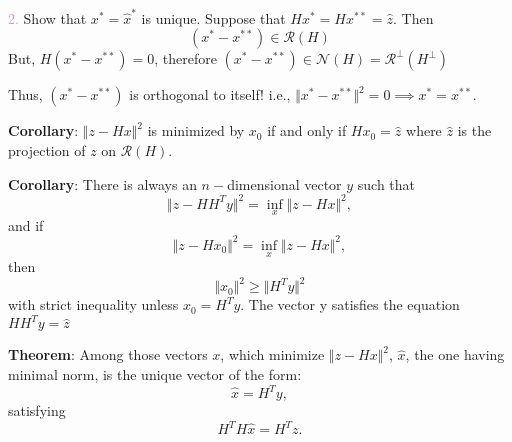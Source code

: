 \documentclass[aspectratio=169]{beamer}
\begin{document}
\begin{frame}{} %
	

	\textcolor{violet}{2.} Show that $x^\ast = \hat{x}^\ast$ is unique. Suppose that $H x^\ast = H x^{\ast\ast}= \hat{z}$. Then
	\[ (x^\ast - x^{\ast\ast} ) \in \mathcal{R}(H) \]
	But, $H(x^\ast - x^{\ast\ast} ) = 0$, therefore $ (x^\ast - x^{\ast\ast} ) \in \mathcal{N}(H) = \mathcal{R^\perp}(H^\perp) $
	
	Thus, $(x^\ast - x^{\ast\ast} )$ is orthogonal to itself! i.e., $\Vert x^\ast  - x^{\ast\ast} \Vert^2 = 0 \implies x^\ast = x^{\ast\ast}. $

\end{frame}

\begin{frame}{}  %
	
	{\color{violet} \textbf{Corollary}:}  $\Vert z - H x \Vert^2$ is minimized by $x_0$ if and only if $H x_0 = \hat{z}$ where $\hat{z}$ is the projection of $z$ on $\mathcal{R}(H)$.
	\vspace*{5mm}
		
	{\color{violet} \textbf{Corollary}:} There is always an $n-$dimensional vector $y$ such that
	\[ \Vert z - H H^T y\Vert^2 = \inf_ x \Vert z - H x \Vert^2,\]
	\noindent and if
	\[ \Vert z - H x_0 \Vert^2 = \inf_ x \Vert z - H x \Vert^2,\]
	\noindent then
	\[ \Vert x_0 \Vert^2 \geq \Vert H^T y\Vert^2\]
	with strict inequality unless $x_0 = H^T y$. The vector y satisfies the equation $H H^T y = \hat{z}$
\end{frame}

\begin{frame}{} %
	
	{\color{violet} \textbf{Theorem}:} Among those vectors $x$, which minimize $\Vert z - H x\Vert^2$, $\hat{x}$, the one having minimal norm, is the unique vector of the form:
	\[\hat{x}= H^Ty,\]
	\noindent satisfying
	\[ H^T H \hat{x} = H^T z. \]
\end{frame}
\end{document}
